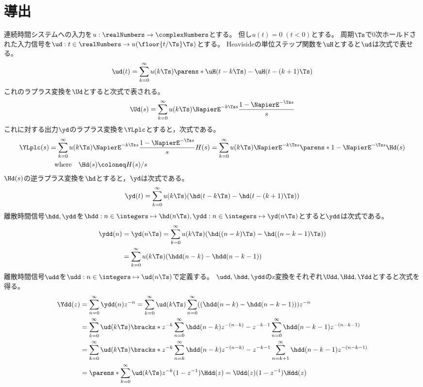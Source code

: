     \section{導出}
        連続時間システムへの入力を$u:\realNumbers\to\complexNumbers$とする。
        但し$u(t)=0\;(t<0)$とする。
        周期$\Ts$で0次ホールドされた入力信号を$\ud:t\in\realNumbers\to u(\floor{t/\Ts}\Ts)$とする。
        Heavisideの単位ステップ関数を$\uH$とすると$\ud$は次式で表せる。
        \[ \ud(t) = \sum_{k=0}^\infty u(k\Ts)\parens*{\uH(t-k\Ts) - \uH(t-(k+1)\Ts)} \]
        これのラプラス変換を$\Ud$とすると次式で表される。
        \[ \Ud(s) = \sum_{k=0}^\infty u(k\Ts)\NapierE^{-k\Ts s}\frac{1-\NapierE^{-\Ts s}}{s} \]
        これに対する出力$\yd$のラプラス変換を$\YLplc$とすると，次式である。
        \begin{align*}
            \YLplc(s) &= \sum_{k=0}^\infty u(k\Ts)\NapierE^{-k\Ts s}\frac{1-\NapierE^{-\Ts s}}{s}H(s) = \sum_{k=0}^\infty u(k\Ts)\NapierE^{-k\Ts s}\parens*{1-\NapierE^{-\Ts s}}\Hd(s) \\
            &\phantom{=} \text{where} \quad \Hd(s) \coloneq H(s)/s
        \end{align*}
        $\Hd(s)$の逆ラプラス変換を$\hd$とすると，$\yd$は次式である。
        \[ \yd(t) = \sum_{k=0}^\infty u(k\Ts)(\hd(t-k\Ts)-\hd(t-(k+1)\Ts)) \]
        離散時間信号$\hdd,\ydd$を$\hdd:n\in\integers\mapsto \hd(n\Ts),\ydd:n\in\integers\mapsto \yd(n\Ts)$とすると$\ydd$は次式である。
        \begin{align*}
            \ydd(n) &= \yd(n\Ts) = \sum_{k=0}^\infty u(k\Ts)(\hd((n-k)\Ts)-\hd((n-k-1)\Ts)) \\
            &= \sum_{k=0}^\infty u(k\Ts)(\hdd(n-k)-\hdd(n-k-1))
        \end{align*}
        離散時間信号$\udd$を$\udd:n\in\integers\mapsto\ud(n\Ts)$で定義する。
        $\udd,\hdd,\ydd$のz変換をそれぞれ$\Udd,\Hdd,\Ydd$とすると次式を得る。
        \begin{align*}
            \Ydd(z) &= \sum_{n=0}^\infty \ydd(n) z^{-n} = \sum_{k=0}^\infty \ud(k\Ts) \sum_{n=0}^\infty ((\hdd(n-k)-\hdd(n-k-1))) z^{-n} \\
            &= \sum_{k=0}^\infty \ud(k\Ts)\bracks*{z^{-k}\sum_{n=0}^\infty \hdd(n-k)z^{-(n-k)} - z^{-k-1}\sum_{n=0}^\infty \hdd(n-k-1)z^{-(n-k-1)}} \\
            &= \sum_{k=0}^\infty \ud(k\Ts)\bracks*{z^{-k}\sum_{n=k}^\infty \hdd(n-k)z^{-(n-k)} - z^{-k-1}\sum_{n=k+1}^\infty \hdd(n-k-1)z^{-(n-k-1)}} \\
            &= \parens*{\sum_{k=0}^\infty \ud(k\Ts)z^{-k}}(1-z^{-1})\Hdd(z) = \Udd(z)(1-z^{-1})\Hdd(z)
        \end{align*}